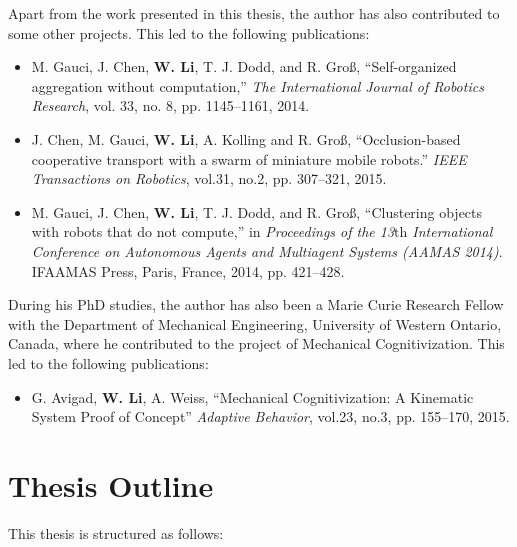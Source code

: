 Apart from the work presented in this thesis, the author has also contributed to some other projects. This led to the following publications:

\begin{itemize}
%
\item M. Gauci, J. Chen, \textbf{W. Li}, T. J. Dodd, and R. Gro{\ss}, ``Self-organized aggregation without computation,'' \textit{The International Journal of Robotics Research}, vol. 33, no. 8, pp. 1145--1161, 2014.
%
\item J. Chen, M. Gauci, \textbf{W. Li}, A. Kolling and R. Gro{\ss}, ``Occlusion-based cooperative transport with a swarm of miniature mobile robots.''\textit{ IEEE Transactions on Robotics}, vol.31, no.2, pp. 307--321, 2015.
%
\item M. Gauci, J. Chen, \textbf{W. Li}, T. J. Dodd, and R. Gro{\ss}, ``Clustering objects with robots that do not compute,'' in \textit{Proceedings of the 13${\textrm{th}}$ International Conference on Autonomous Agents and Multiagent Systems (AAMAS 2014)}. IFAAMAS Press, Paris, France, 2014, pp. 421--428.
%
\end{itemize}

During his PhD studies, the author has also been a Marie Curie Research Fellow with the Department of Mechanical Engineering, University of Western Ontario, Canada, where he contributed to the project of Mechanical Cognitivization. This led to the following publications:

\begin{itemize}
%
\item G. Avigad, \textbf{W. Li}, A. Weiss, ``Mechanical Cognitivization: A Kinematic System Proof of Concept'' \textit{Adaptive Behavior}, vol.23, no.3, pp. 155--170, 2015.
%
\end{itemize}

\section{Thesis Outline}

This thesis is structured as follows:

